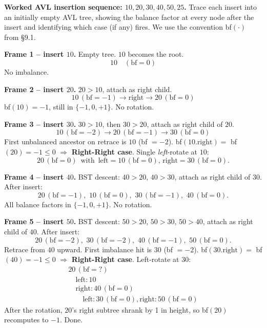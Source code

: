 \documentclass[11pt]{article}
\begin{document}
\begin{examplebox}
\textbf{Worked AVL insertion sequence: $10, 20, 30, 40, 50, 25$.}
Trace each insert into an initially empty AVL tree, showing the
balance factor at every node after the insert and identifying which
case (if any) fires. We use the convention bf$(\cdot)$ from \S9.1.

\textbf{Frame 1 -- insert $10$.} Empty tree. $10$ becomes the root.
\[
10 \quad (\text{bf} = 0)
\]
No imbalance.

\textbf{Frame 2 -- insert $20$.} $20 > 10$, attach as right child.
\[
10 \,(\text{bf} = -1) \to \text{right} \to 20 \,(\text{bf} = 0)
\]
bf$(10) = -1$, still in $\{-1, 0, +1\}$. No rotation.

\textbf{Frame 3 -- insert $30$.} $30 > 10$, then $30 > 20$, attach
as right child of $20$.
\[
10 \,(\text{bf} = -2) \to 20 \,(\text{bf} = -1) \to 30 \,(\text{bf} = 0)
\]
First unbalanced ancestor on retrace is $10$ (bf $= -2$).
bf$(10.\text{right}) = $ bf$(20) = -1 \le 0$ $\Rightarrow$
\textbf{Right-Right case}. Single \emph{left}-rotate at $10$:
\[
20 \,(\text{bf} = 0) \,\,\,\text{with}\,\,\, \text{left} = 10 \,(\text{bf} = 0),\, \text{right} = 30 \,(\text{bf} = 0).
\]

\textbf{Frame 4 -- insert $40$.} BST descent: $40 > 20$, $40 > 30$,
attach as right child of $30$. After insert:
\[
20 \,(\text{bf} = -1),\,\, 10 \,(\text{bf} = 0),\,\, 30 \,(\text{bf} = -1),\,\, 40 \,(\text{bf} = 0).
\]
All balance factors in $\{-1, 0, +1\}$. No rotation.

\textbf{Frame 5 -- insert $50$.} BST descent: $50 > 20$, $50 > 30$,
$50 > 40$, attach as right child of $40$. After insert:
\[
20 \,(\text{bf} = -2),\,\, 30 \,(\text{bf} = -2),\,\, 40 \,(\text{bf} = -1),\,\, 50 \,(\text{bf} = 0).
\]
Retrace from $40$ upward. First imbalance hit is $30$ (bf $= -2$).
bf$(30.\text{right}) = $ bf$(40) = -1 \le 0$ $\Rightarrow$
\textbf{Right-Right case}. Left-rotate at $30$:
\[
\begin{array}{l}
20 \,(\text{bf} = ?) \\
\quad \text{left}: 10 \\
\quad \text{right}: 40 \,(\text{bf} = 0) \\
\qquad \text{left}: 30 \,(\text{bf} = 0), \text{right}: 50 \,(\text{bf} = 0)
\end{array}
\]
After the rotation, $20$'s right subtree shrank by 1 in height, so
bf$(20)$ recomputes to $-1$. Done.


\end{examplebox}
\end{document}
